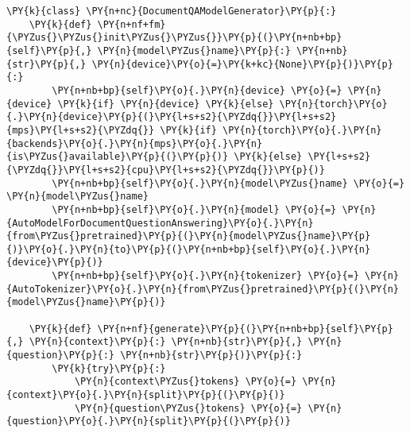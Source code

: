 \documentclass[11pt]{wseas}
\begin{document}
\begin{tcolorbox}[breakable, size=fbox, boxrule=1pt, pad at break*=1mm,colback=cellbackground, colframe=cellborder]
\begin{Verbatim}[commandchars=\\\{\}]
\PY{k}{class} \PY{n+nc}{DocumentQAModelGenerator}\PY{p}{:}
    \PY{k}{def} \PY{n+nf+fm}{\PYZus{}\PYZus{}init\PYZus{}\PYZus{}}\PY{p}{(}\PY{n+nb+bp}{self}\PY{p}{,} \PY{n}{model\PYZus{}name}\PY{p}{:} \PY{n+nb}{str}\PY{p}{,} \PY{n}{device}\PY{o}{=}\PY{k+kc}{None}\PY{p}{)}\PY{p}{:}
        \PY{n+nb+bp}{self}\PY{o}{.}\PY{n}{device} \PY{o}{=} \PY{n}{device} \PY{k}{if} \PY{n}{device} \PY{k}{else} \PY{n}{torch}\PY{o}{.}\PY{n}{device}\PY{p}{(}\PY{l+s+s2}{\PYZdq{}}\PY{l+s+s2}{mps}\PY{l+s+s2}{\PYZdq{}} \PY{k}{if} \PY{n}{torch}\PY{o}{.}\PY{n}{backends}\PY{o}{.}\PY{n}{mps}\PY{o}{.}\PY{n}{is\PYZus{}available}\PY{p}{(}\PY{p}{)} \PY{k}{else} \PY{l+s+s2}{\PYZdq{}}\PY{l+s+s2}{cpu}\PY{l+s+s2}{\PYZdq{}}\PY{p}{)}
        \PY{n+nb+bp}{self}\PY{o}{.}\PY{n}{model\PYZus{}name} \PY{o}{=} \PY{n}{model\PYZus{}name}
        \PY{n+nb+bp}{self}\PY{o}{.}\PY{n}{model} \PY{o}{=} \PY{n}{AutoModelForDocumentQuestionAnswering}\PY{o}{.}\PY{n}{from\PYZus{}pretrained}\PY{p}{(}\PY{n}{model\PYZus{}name}\PY{p}{)}\PY{o}{.}\PY{n}{to}\PY{p}{(}\PY{n+nb+bp}{self}\PY{o}{.}\PY{n}{device}\PY{p}{)}
        \PY{n+nb+bp}{self}\PY{o}{.}\PY{n}{tokenizer} \PY{o}{=} \PY{n}{AutoTokenizer}\PY{o}{.}\PY{n}{from\PYZus{}pretrained}\PY{p}{(}\PY{n}{model\PYZus{}name}\PY{p}{)}

    \PY{k}{def} \PY{n+nf}{generate}\PY{p}{(}\PY{n+nb+bp}{self}\PY{p}{,} \PY{n}{context}\PY{p}{:} \PY{n+nb}{str}\PY{p}{,} \PY{n}{question}\PY{p}{:} \PY{n+nb}{str}\PY{p}{)}\PY{p}{:}
        \PY{k}{try}\PY{p}{:}
            \PY{n}{context\PYZus{}tokens} \PY{o}{=} \PY{n}{context}\PY{o}{.}\PY{n}{split}\PY{p}{(}\PY{p}{)}
            \PY{n}{question\PYZus{}tokens} \PY{o}{=} \PY{n}{question}\PY{o}{.}\PY{n}{split}\PY{p}{(}\PY{p}{)}
            

\end{Verbatim}
\end{tcolorbox}
\end{document}
